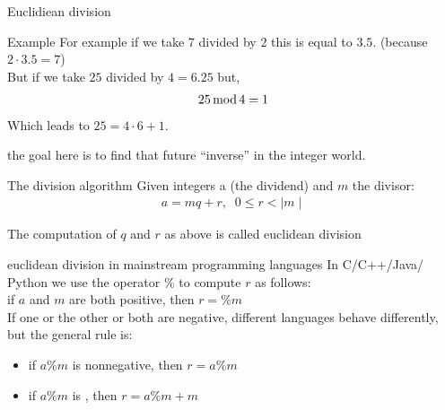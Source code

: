     \begin{parag}{Euclidiean division}
        \begin{subparag}{Example}
            For example if we take $7$ divided by $2$ this is equal to $3.5$. (because $2 \cdot  3.5 = 7$)\\
            But if we take $25$ divided by $4 = 6.25$ but,
            \begin{align*} 25 \operatorname{mod} 4 = 1 \end{align*}
            Which leads to $25 = 4 \cdot  6 + 1$.
            \begin{framedremark}
                the goal here is to find that future ``inverse'' in the integer world.
            \end{framedremark}

        \end{subparag}
        \begin{subparag}{The division algorithm}
            Given integers a (the dividend) and $m$ the divisor:
            \begin{align*}
                a = mq + r, \; \; 0 \leq r < \mid m \mid
            \end{align*}
            \begin{framedremark}
                The computation of $q$ and $r$ as above is called euclidean division
            \end{framedremark}
        \end{subparag}
     
        \begin{subparag}{euclidean division in mainstream programming languages}
            In  C/C++/Java/ Python we use the operator \% to compute $r$ as follows:\\
            if $a$ and $m$ are both positive, then $r = \% m$\\
            If one or the other or both are negative, different languages behave differently, but the general rule is:
            \begin{itemize}
                \item if $ a \% m$ is nonnegative, then $r  = a \% m$
                \item if $ a \% m$ is , then $r = a \% m + m$
            \end{itemize}

            
        \end{subparag}
    \end{parag}
    
